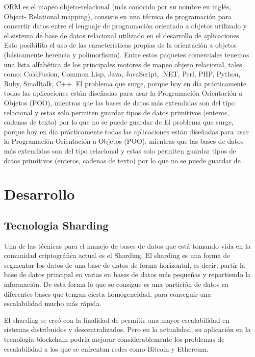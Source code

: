 \documentclass[twoside,twocolumn]{article}
\begin{document}
ORM es el mapeo objeto-relacional (más conocido por su nombre en inglés, Object- Relational mapping), consiste
en una técnica de programación para convertir datos entre el lenguaje de programación
orientado a objetos utilizado y el sistema de base de datos relacional utilizado en el
desarrollo de aplicaciones. Esto posibilita el uso de las características propias de la
orientación a objetos (básicamente herencia y polimorfismo). Entre estos paquetes comerciales tenemos
una lista alfabética de los principales motores de mapeo objeto relacional, tales como:
ColdFusion, Common Lisp, Java, JavaScript, .NET, Perl, PHP, Python, Ruby, Smalltalk, C++. El problema que surge, porque hoy en
día prácticamente todas las aplicaciones están diseñadas para usar la Programación
Orientación a Objetos (POO), mientras que las bases de datos más extendidas son del
tipo relacional y estas solo permiten guardar tipos de datos primitivos (enteros, cadenas
de texto) por lo que no se puede guardar de El problema que surge, porque hoy en
día prácticamente todas las aplicaciones están diseñadas para usar la Programación
Orientación a Objetos (POO), mientras que las bases de datos más extendidas son del
tipo relacional y estas solo permiten guardar tipos de datos primitivos (enteros, cadenas de texto) por lo que no se puede guardar de 


\section{Desarrollo}

\subsection{Tecnologia Sharding }

Una de las técnicas para el manejo de bases de datos que está 
tomando vida en la comunidad criptográfica actual es el Sharding.
El sharding es una forma de segmentar los 
datos de una base de datos de forma horizontal, es decir, 
partir la base de datos principal en varias en bases de datos 
más pequeñas y repartiendo la información. De esta forma lo que 
se consigue es una partición de datos en diferentes bases que tengan 
cierta homogeneidad, para conseguir una escalabilidad mucho más rápida. 


El sharding se creó con la finalidad de permitir una mayor
 escalabilidad en sistemas distribuidos y descentralizados. 
 Pero en la actualidad, su aplicación en la tecnología blockchain 
 podría mejorar considerablemente los problemas de escalabilidad a 
 los que se enfrentan redes como Bitcoin y Ethereum.
\end{document}
